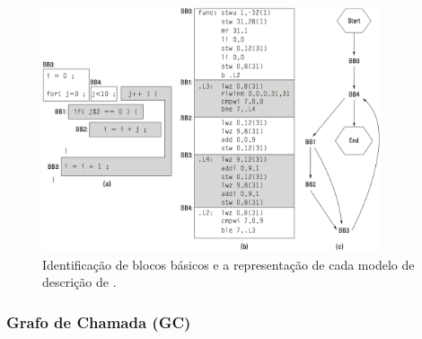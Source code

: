       \begin{frame} %
         \begin{figure}[h] \centering
            \includegraphics[width=0.89\textwidth]{img/f3-6.png}
            \caption{Identificação de blocos básicos e a representação de cada modelo de descrição de \software.}
         \end{figure}
      \end{frame}
   
   \subsubsection{Grafo de Chamada (GC)}
   
